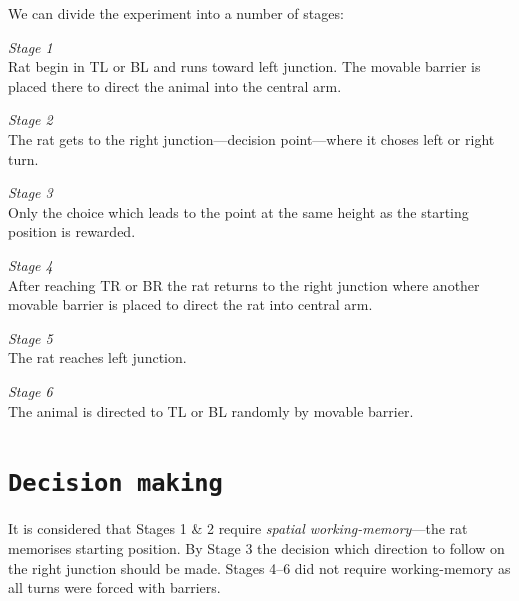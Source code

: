 \documentclass[11pt,a4paper,twocolumn]{article}
\begin{document}
We can divide the experiment into a number of stages:
\begin{description}
\item{\emph{Stage 1}} \hfill\\
Rat begin in TL or BL and runs toward left junction. The movable barrier is placed there to direct the animal into the central arm.
\item{\emph{Stage 2}} \hfill\\
The rat gets to the right junction---decision point---where it choses left or right turn.
\item{\emph{Stage 3}} \hfill\\
Only the choice which leads to the point at the same height as the starting position is rewarded.
\item{\emph{Stage 4}} \hfill\\
After reaching TR or BR the rat returns to the right junction where another movable barrier is placed to direct the rat into central arm.
\item{\emph{Stage 5}} \hfill\\
The rat reaches left junction.
\item{\emph{Stage 6}} \hfill\\
The animal is directed to TL or BL randomly by movable barrier.
\end{description}


\section*{\texttt{Decision making}}
It is considered that Stages 1 \& 2 require \emph{spatial working-memory}---the rat memorises starting position. By Stage 3 the decision which direction to follow on the right junction should be made. Stages 4--6 did not require working-memory as all turns were forced with barriers.\\
\end{document}
